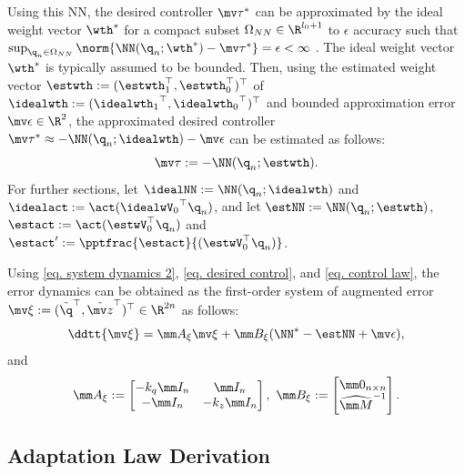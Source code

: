 \documentclass[letterpaper, 10 pt, conference]{ieeeconf}  %
\begin{document}
Using this NN, the desired controller $\mv \tau^*$ can be approximated by the ideal weight vector $\wth^*$ for a compact subset $\Omega_{NN}\in\R^{l_0+1}$ to $\epsilon$ accuracy such that $\sup_{{\q_{n}}\in\Omega_{NN}} \allowbreak \norm{\NN({\q_{n}};\wth^*) - \mv \tau^*}=\epsilon<\infty$ \cite{Cybenko:1989aa}.
The ideal weight vector $\wth^*$ is typically assumed to be bounded.
Then, using the estimated weight vector $\estwth:=(\estwth_1^\top ,\estwth_0^\top )^\top $ of $\idealwth:=({\idealwth_{1}}^{\top},{\idealwth_{0}}^{\top})^\top $ and bounded approximation error $\mv \epsilon\in\R^2$, the approximated desired controller $\mv \tau^*\approx -\NN(\q_{n};\idealwth)-\mv\epsilon$ can be estimated as follows:
\begin{equation}
    \mv \tau := -\NN({\q_{n}};\estwth)
    .
    \label{eq. control law}
\end{equation}
For further sections, let $\idealNN:=\NN({\q_{n}};\idealwth)$ and $\idealact :=\act({\idealwV_0}^{\top}{\q_{n}})$, and let $\estNN:={\NN}({\q_{n}};\estwth)$, $\estact :=\act(\estwV_0^{\top}{\q_{n}})$ and $\estact' := \pptfrac{\estact}{(\estwV_0^\top \q_{n})}$.

Using \eqref{eq. system dynamics 2}, \eqref{eq. desired control}, and \eqref{eq. control law}, the error dynamics can be obtained as the first-order system of augmented error $\mv \xi:=({\tilde {\q}}^\top ,{\tilde {\mv z}}^\top)^\top \in\R^{2n}$ as follows:
\begin{equation}
    \ddtt{\mv \xi} 
    = 
    \mm A_\xi{\mv \xi}+\mm B_\xi(\NN^*-\estNN+\mv\epsilon)
    ,
\end{equation}
and 
\begin{equation}
    \mm A_\xi := 
    \begin{bmatrix}
        -{k_q} \mm I_{n} &\mm I_{n}
        \\
        -\mm I_{n}& -{k_z} \mm I_{n}
    \end{bmatrix}
    ,\ 
    \mm B_\xi := 
    \begin{bmatrix}
        \mm 0_{n\times n}\\\widehat{\mm M}^{-1}
    \end{bmatrix}.
\end{equation}

\subsection{Adaptation Law Derivation}\label{sec:adap_laws}
\end{document}

